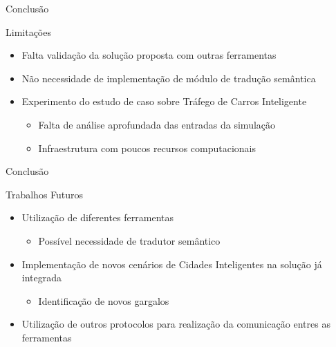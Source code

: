 \documentclass[xcolor={usenames,svgnames,dvipsnames},brazil,english,12pt,aspectratio=149]{beamer}
\begin{document}
\begin{frame}{Conclusão}
    \begin{block}{Limitações}
        \begin{itemize}
            \item Falta validação da solução proposta com outras ferramentas
            \item Não necessidade de implementação de módulo de tradução semântica
            \item Experimento do estudo de caso sobre Tráfego de Carros Inteligente
                \begin{itemize}
                    \item Falta de análise aprofundada das entradas da simulação
                    \item Infraestrutura com poucos recursos computacionais
                \end{itemize}
        \end{itemize}
    \end{block}
\end{frame}

\begin{frame}{Conclusão}
    \begin{block}{Trabalhos Futuros}
        \begin{itemize}
            \item Utilização de diferentes ferramentas
                \begin{itemize}
                    \item Possível necessidade de tradutor semântico
                \end{itemize}
            \item Implementação de novos cenários de Cidades Inteligentes na solução já integrada
                \begin{itemize}
                    \item Identificação de novos gargalos
                \end{itemize}
            \item Utilização de outros protocolos para realização da comunicação entres as ferramentas
        \end{itemize}
    \end{block}
\end{frame}
\end{document}
